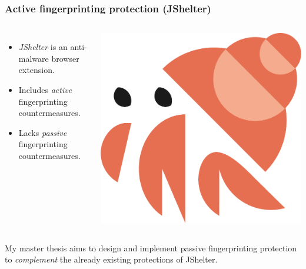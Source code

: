 \begin{frame}
	\frametitle{Active fingerprinting protection (JShelter)}
	
	\begin{columns}
		\begin{itemize}
			\item \emph{JShelter} is an anti-malware browser extension.
			\item Includes \emph{active} fingerprinting countermeasures.
			\item Lacks \emph{passive} fingerprinting countermeasures.
		\end{itemize}
		
			\includegraphics[width=\textwidth]{img/jshelter-hero.pdf}
	\end{columns}
	
	\bigskip
	\bigskip
	
	My master thesis aims to design and implement passive fingerprinting protection to \emph{complement} the already existing protections of JShelter.
\end{frame}

